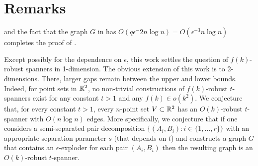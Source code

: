 \documentclass{patmorin}
\begin{document}
\section{Remarks}

 and the fact that the graph $G$
in  has $O(q\epsilon^-2 n\log
n)=O(\epsilon^{-3}n\log n)$ completes the proof of .

Except possibly for the dependence on $\epsilon$, this work settles
the question of $f(k)$-robust spanners in 1-dimension. The obvious
extension of this work is to 2-dimensions.  There, larger gaps remain
between the upper and lower bounds.  Indeed, for point sets in $\mathbb{R}^2$,
no non-trivial constructions of $f(k)$-robust $t$-spanners exist for any
constant $t>1$ and any $f(k)\in o(k^2)$.  We conjecture that, for every
constant $t>1$, every $n$-point set $V\subset\mathbb{R}^2$ has an $O(k)$-robust
$t$-spanner with $O(n\log n)$ edges.  More specifically, we conjecture
that if one considers a semi-separated pair decomposition $\{(A_i,B_i):
i\in\{1,\ldots,r\}\}$ \cite{abam.deberg.ea:region,abam.carmi.ea:on,abam.deberg.ea:geometric} with an appropriate separation parameter $s$
(that depends on $t$) and constructs a graph $G$ that contains an
$\epsilon$-exploder for each pair $(A_i,B_i)$ then the resulting graph
is an $O(k)$-robust $t$-spanner.
\end{document}
